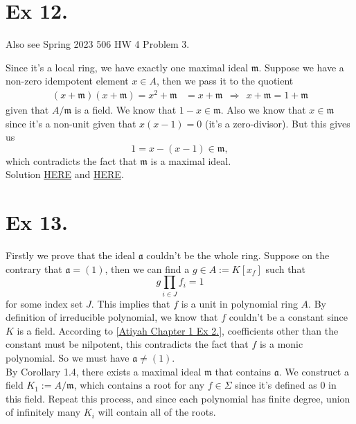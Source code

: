 \section{Ex 12.}

\vspace{0.2in}Also see Spring 2023 506 HW 4 Problem 3.\vspace{0.2in}

Since it's a local ring, we have exactly one maximal ideal $\mathfrak m$. Suppose we have a non-zero idempotent element $x\in A$, then we pass it to the quotient
\begin{align*}
    (x+\mathfrak m)(x+\mathfrak m)=x^2+\mathfrak m&=x+\mathfrak m
    ~~\Rightarrow~~ x+\mathfrak m=1+\mathfrak m
\end{align*} given that $A/\mathfrak m$ is a field. We know that $1-x\in \mathfrak m$. Also we know that $x\in\mathfrak m$ since it's a non-unit given that $x(x-1)=0$ (it's a zero-divisor). But this gives us 
$$1=x-(x-1)\in \mathfrak m,$$ which contradicts the fact that $\mathfrak m$ is a maximal ideal.\\

Solution \href{https://math.stackexchange.com/questions/3180861/proof-check-idempotents-of-a-local-commutative-ring}{HERE} and \href{https://math.stackexchange.com/questions/725171/idempotents-in-a-local-ring}{HERE}.



\section{Ex 13.}

\indent Firstly we prove that the ideal $\mathfrak a$ couldn't be the whole ring. Suppose on the contrary that $\mathfrak a=(1)$, then we can find a $g\in A:=K[x_f]$ such that 
$$g\prod_{i\in J}f_i=1$$ for some index set $J$. This implies that $f$ is a unit in polynomial ring $A$. By definition of irreducible polynomial, we know that $f$ couldn't be a constant since $K$ is a field. According to \ref{Atiyah Chapter 1 Ex 2.}, coefficients other than the constant must be nilpotent, this contradicts the fact that $f$ is a monic polynomial. So we must have $\mathfrak a\neq (1)$.\\

By Corollary 1.4, there exists a maximal ideal $\mathfrak m$ that contains $\mathfrak a$. We construct a field $K_1:=A/\mathfrak m$, which contains a root for any $f\in \Sigma$ since it's defined as $0$ in this field. Repeat this process, and since each polynomial has finite degree, union of infinitely many $K_i$ will contain all of the roots. 

